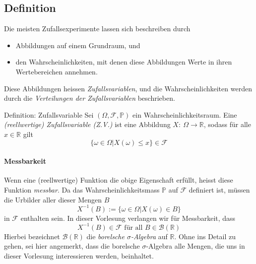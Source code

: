 \documentclass[a4paper,10pt]{article}
\def\R{\mathbb{R}}
\def\P{\mathbb{P}}
\begin{document}
\subsection{Definition}

Die meisten Zufallsexperimente lassen sich beschreiben durch
\begin{itemize}
    \item Abbildungen auf einem Grundraum, und
    \item den Wahrscheinlichkeiten, mit denen diese Abbildungen Werte in ihren Wertebereichen annehmen.
\end{itemize}
Diese Abbildungen heissen \emph{Zufallsvariablen}, und die Wahrscheinlichkeiten werden durch die \emph{Verteilungen der Zufallsvariablen} beschrieben.

\begin{mainbox}{Definition: Zufallsvariable}
    Sei \( (\Omega, \mathcal{F}, \P) \) ein Wahrscheinlichkeitsraum. Eine \emph{(reellwertige) Zufallsvariable (Z.V.)} ist eine Abbildung \( X: \: \Omega \to \R \), sodass für alle \( x \in \R \) gilt \[ \{ \omega \in \Omega | X(\omega) \leq x \} \in \mathcal{F} \]
\end{mainbox}

\paragraph{Messbarkeit} Wenn eine (reellwertige) Funktion die obige Eigenschaft erfüllt, heisst diese Funktion \emph{messbar}. Da das Wahrscheinlichkeitsmass \( \P \) auf \( \mathcal{F} \) definiert ist, müssen die Urbilder aller dieser Mengen \( B \) \[ X^{-1}(B) := \{ \omega \in \Omega | X(\omega) \in B \} \] in \( \mathcal{F} \) enthalten sein. In dieser Vorlesung verlangen wir für Messbarkeit, dass \[ X^{-1}(B) \in \mathcal{F} \text{ für all } B \in \mathcal{B}(\R) \] Hierbei bezeichnet \( \mathcal{B}(\R) \) die \emph{borelsche \( \sigma \)-Algebra} auf \( \R \). Ohne ins Detail zu gehen, sei hier angemerkt, dass die borelsche \( \sigma \)-Algebra alle Mengen, die uns in dieser Vorlesung interessieren werden, beinhaltet.
\end{document}
